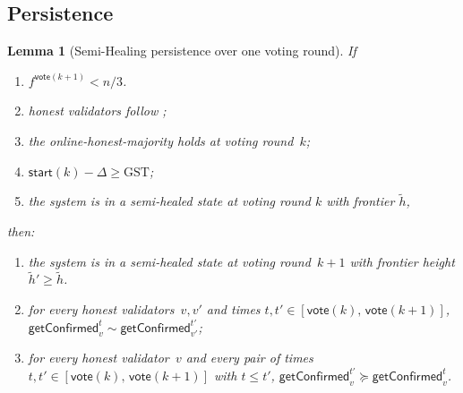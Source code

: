 \ifx\litemode\undefined\documentclass{article}\fi
\newcommand{\start}{\ensuremath{\mathsf{start}}}
\newcommand{\vote}{\ensuremath{\mathsf{vote}}}
\newcommand{\GST}{\ensuremath{\mathrm{GST}}\xspace}
\newcommand{\comm}[1]{\ensuremath{\widetilde{#1}}}
\newcommand{\getConfirmed}{\textsf{getConfirmed}\xspace}
\theoremstyle{plain}
\newtheorem{lemma}{Lemma}
\theoremstyle{definition}
\theoremstyle{remark}
\begin{document}
\subsection{Persistence}\label{sec:healing-persistence}
\begin{lemma}[Semi-Healing persistence over one voting round]\label{lem:semi-healing-persistence}
If
\begin{enumerate}
  \item $f^{\vote(k+1)}<n/3$.
  \item honest validators follow ;
  \item the online-honest-majority holds at voting round~$k$;
  \item $\start(k) - \Delta \geq \GST$;
  \item the system is in a semi-healed state at voting round $k$ with frontier $\comm{h}$,
\end{enumerate}
then:
\begin{enumerate}
  \item the system is in a semi-healed state at voting round~$k+1$ with frontier height $\comm{h}' \geq \comm{h}$.
  \item for every honest validators~$v,v'$ and times $t, t' \in [\vote(k),\, \vote(k+1)]$, $\getConfirmed_v^{t} \sim \getConfirmed_{v'}^{t'}$;
  \item for every honest validator~$v$ and every pair of times $t, t' \in [\vote(k),\, \vote(k+1)]$ with $t \leq t'$, $\getConfirmed_v^{t'} \succeq \getConfirmed_v^t$.
\end{enumerate}
\end{lemma}
\end{document}
